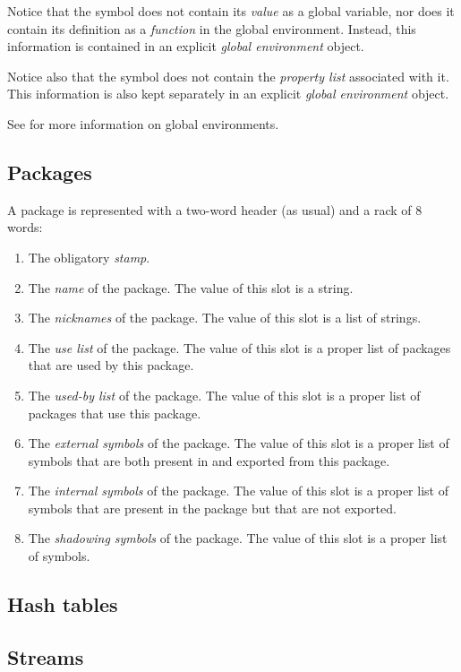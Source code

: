 Notice that the symbol does not contain its \emph{value} as a global
variable, nor does it contain its definition as a \emph{function} in
the global environment.  Instead, this information is contained in an
explicit \emph{global environment} object.

Notice also that the symbol does not contain the \emph{property list}
associated with it.  This information is also kept separately in an
explicit \emph{global environment} object.

See  for more information on
global environments.

\subsection{Packages}

A package is represented with a two-word header (as usual) and a
rack of 8 words:

\begin{enumerate}
\item The obligatory \emph{stamp}.
\item The \emph{name} of the package.  The value of this slot is a
  string.
\item The \emph{nicknames} of the package.  The value of this slot is
  a list of strings.
\item The \emph{use list} of the package.  The value of this slot is a
  proper list of packages that are used by this package.
\item The \emph{used-by list} of the package.  The value of this slot
is a proper list of packages that use this package.
\item The \emph{external symbols} of the package.  The value of this
  slot is a proper list of symbols that are both present in and
  exported from this package.
\item The \emph{internal symbols} of the package.  The value of this
  slot is a proper list of symbols that are present in the package but
  that are not exported.
\item The \emph{shadowing symbols} of the package.  The value of this
  slot is a proper list of symbols.
\end{enumerate}

\subsection{Hash tables}

\subsection{Streams}

